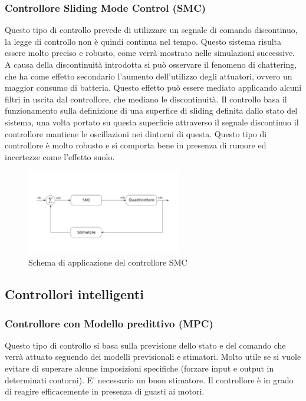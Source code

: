 \subsubsection{Controllore Sliding Mode Control (SMC)}

Questo tipo di controllo prevede di utilizzare un segnale di comando discontinuo, la legge di controllo non è quindi continua nel tempo. Questo sistema risulta essere molto preciso e robusto, come verrà mostrato nelle simulazioni successive. A causa della discontinuità introdotta si può  osservare il fenomeno di chattering, che ha come effetto secondario l'aumento dell'utilizzo degli attuatori, ovvero un maggior consumo di batteria. Questo effetto può essere mediato applicando alcuni filtri in uscita dal controllore, che mediano le discontinuità. Il controllo basa il funzionamento sulla definizione di una superfice di sliding definita dallo stato del sistema, una volta portato su questa superficie attraverso il segnale discontinuo il controllore mantiene le oscillazioni nei dintorni di questa. Questo tipo di controllore è molto robusto e si comporta bene in presenza di rumore ed incertezze come l'effetto suolo.

\begin{figure}
	\centering
	\includegraphics[width=0.6\textwidth]{SistemaQuadrirotore/Figure/SMC}
	\caption{Schema di applicazione del controllore SMC}
\end{figure}

\subsection{Controllori intelligenti}

\subsubsection{Controllore con Modello predittivo (MPC)}

Questo tipo di controllo si basa sulla previsione dello stato e del comando che verrà attuato seguendo dei modelli previsionali e stimatori. Molto utile se si vuole evitare di superare alcune imposizioni specifiche (forzare input e output in determinati contorni).
E' necessario un buon stimatore. Il controllore è in grado di reagire efficacemente in presenza di guasti ai motori.


